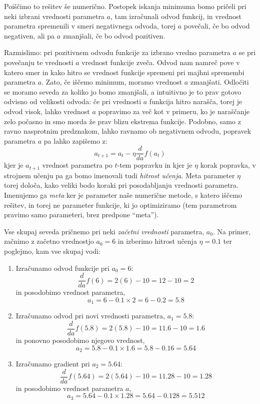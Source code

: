  Poiščimo to rešitev še numerično. Postopek iskanja minimuma bomo pričeli pri neki izbrani vrednosti parametra \( a \), tam izračunali odvod funkcij, in vrednost parametra spremenili v smeri negativnega odvoda, torej $a$ povečali, če bo odvod negativen, ali pa $a$ zmanjšali, če bo odvod pozitiven. 

Razmislimo: pri pozitivnem odvodu funkcije za izbrano vredno parametra $a$ se pri povečanju te vrednosti $a$ vrednost funkcije zveča. Odvod nam namreč pove v katero smer in kako hitro se vrednost funkcije spremeni pri majhni spremembi parametra 
$a$. Zato, če iščemo minimum, moramo vrednost $a$ zmanjšati. Odločiti se moramo seveda za koliko jo bomo zmanjšali, a intuitivno je to prav gotovo odvisno od velikosti odvoda: če pri vrednosti $a$ funkcija hitro narašča, torej je odvod visok, lahko vrednost $a$ popravimo za več kot v primeru, ko je naraščanje zelo počasno in smo morda že prav blizu ekstrema funkcije. Podobno, samo z ravno nasprotnim predznakom, lahko ravnamo ob negativnem odvodu, popravek parametra $a$ pa lahko zapišemo z:
\[
a_{t+1} = a_t - \eta \frac{d}{da} f(a_t)
\]
kjer je $a_{t+1}$ vrednost parametra po $t$-tem popravku in kjer je $\eta$ korak popravka, v strojnem učenju pa ga bomo imenovali tudi {\em hitrost učenja}. Meta parameter $\eta$ torej določa, kako veliki bodo koraki pri posodabljanju vrednosti parametra. Imenujemo ga {\em meta} ker je parameter naše numerične metode, s katero iščemo rešitev, in torej ne parameter funkcije, ki jo optimiziramo (tem parametrom pravimo samo parameteri, brez predpone ``meta'').

Vse skupaj seveda pričnemo pri neki {\em začetni vrednosti} parametra, $a_0$. Na primer, začnimo z začetno vrednostjo $a_0=6$ in izberimo hitrost učenja $\eta = 0.1$ ter poglejmo, kam vse skupaj vodi:

\begin{enumerate}
\item Izračunamo odvod funkcije pri \( a_0 = 6 \):
\[
\frac{d}{da} f(6) = 2(6) - 10 = 12 - 10 = 2
\]
%
in posodobimo vrednost parametra,
%
\[
a_1 = 6 - 0.1 \times 2 = 6 - 0.2 = 5.8
\]
\item Izračunamo odvod pri novi vrednosti parametra, \( a_1 = 5.8 \):
\[
\frac{d}{da} f(5.8) = 2(5.8) - 10 = 11.6 - 10 = 1.6
\]
%
in ponovno posodobimo njegovo vrednost,
%
\[
a_2 = 5.8 - 0.1 \times 1.6 = 5.8 - 0.16 = 5.64
\]
\item Izračunamo gradient pri \( a_2 = 5.64 \):
\[
\frac{d}{da} f(5.64) = 2(5.64) - 10 = 11.28 - 10 = 1.28
\]
%
in posodobimo vrednost parametra $a$, 
%
\[
a_3 = 5.64 - 0.1 \times 1.28 = 5.64 - 0.128 = 5.512
\]
\end{enumerate}

